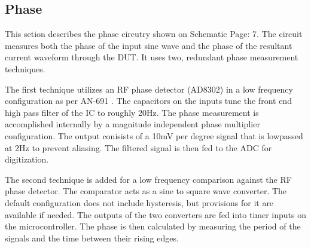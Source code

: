 \subsection{Phase}

This setion describes the phase circutry shown on Schematic Page: 7. The circuit measures both the phase of the input sine wave and the phase of the resultant current waveform through the DUT. It uses two, redundant phase measurement techniques.

The first technique utilizes an RF phase detector (AD8302) in a low frequency configuration as per AN-691 \cite{AD8302_AppNote}. The capacitors on the inputs tune the front end high pass filter of the IC to roughly 20Hz. The phase measurement is accomplished internally by a magnitude independent phase multiplier configuration. The output conisists of a 10mV per degree signal that is lowpassed at 2Hz to prevent aliasing. The filtered signal is then fed to the ADC for digitization.

The second technique is added for a low frequency comparison against the RF phase detector. The comparator acts as a sine to square wave converter. The default configuration does not include hysteresis, but provisions for it are available if needed. The outputs of the two converters are fed into timer inputs on the microcontroller. The phase is then calculated by measuring the period of the signals and the time between their rising edges.

